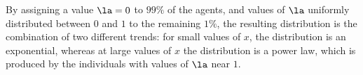 By assigning a value $\la = 0$ to $99 \%$ of the agents, and values of $\la$ uniformly distributed between $0$ and $1$ to the remaining $1\%$, the resulting distribution is the combination of two different trends: for small values of $x$, the distribution is an exponential, whereas at large values of $x$ the distribution is a power law, which is produced by the individuals with values of $\la$ near $1$.
